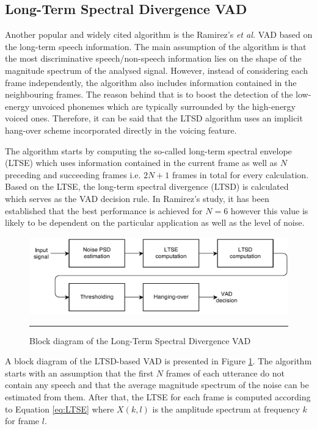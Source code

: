 \subsection{Long-Term Spectral Divergence VAD}

Another popular and widely cited algorithm is the Ramirez's \emph{et al.} \cite{LTSD} VAD based on the long-term speech information. The main assumption of the algorithm is that the most discriminative speech/non-speech information lies on the shape of the magnitude spectrum of the analysed signal. However, instead of considering each frame independently, the algorithm also includes information contained in the neighbouring frames. The reason behind that is to boost the detection of the low-energy unvoiced phonemes which are typically surrounded by the high-energy voiced ones. Therefore, it can be said that the LTSD algorithm uses an implicit hang-over scheme incorporated directly in the voicing feature.

The algorithm starts by computing the so-called long-term spectral envelope (LTSE) which uses information contained in the current frame as well as $N$ preceding and succeeding frames i.e. $2N+1$ frames in total for every calculation. Based on the LTSE, the long-term spectral divergence (LTSD) is calculated which serves as the VAD decision rule. In Ramirez's study, it has been established that the best performance is achieved for $N=6$ however this value is likely to be dependent on the particular application as well as the level of noise.

\begin{figure}[htbp]
	\centering
		\includegraphics[width=0.9\columnwidth]{Figures/Chapter2/LTSD.png}
		\rule{37em}{0.5pt}
	\caption[Block diagram of the Long-Term Spectral Divergence VAD]{Block diagram of the Long-Term Spectral Divergence VAD \cite{LTSD}}
	\label{fig:LTSD}
\end{figure}

A block diagram of the LTSD-based VAD is presented in Figure \ref{fig:LTSD}. The algorithm starts with an assumption that the first $N$ frames of each utterance do not contain any speech and that the average magnitude spectrum of the noise can be estimated from them. After that, the LTSE for each frame is computed according to Equation \ref{eq:LTSE} where $X(k,l)$ is the amplitude spectrum at frequency $k$ for frame $l$.

